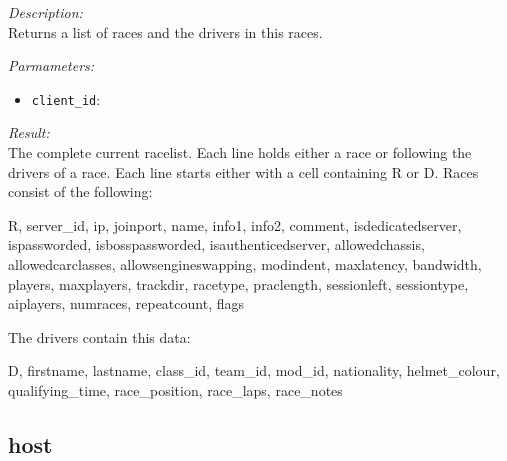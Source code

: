 \begin{description}
\item {\it Description:}\\
Returns a list of races and the drivers in this races.
\item {\it Parmameters:}
\begin{itemize}
\item {\tt client\_id}: 
\end{itemize}
\item {\it Result:}\\
The complete current racelist. Each line holds either a race or following the drivers of a race. Each line starts either with a cell containing R or D. Races consist of the following: 
				
			R, 
			server\_id, 
			ip, 
			joinport, 
			name, 
			info1, 
			info2, 
			comment, 
			isdedicatedserver, 
			ispassworded, 
			isbosspassworded, 
			isauthenticedserver, 
			allowedchassis, 
			allowedcarclasses, 
			allowsengineswapping, 
			modindent, 
			maxlatency, 
			bandwidth, 
			players,
			maxplayers, 
			trackdir, 
			racetype, 
			praclength, 
			sessionleft, 
			sessiontype,
			aiplayers,
			numraces,
			repeatcount,
			flags


			The drivers contain this data:

			D,
			firstname,
			lastname,
			class\_id,
			team\_id,
			mod\_id,
			nationality,
			helmet\_colour,
			qualifying\_time,
			race\_position,
			race\_laps,
			race\_notes
			
\end{description}

\subsection{host}

